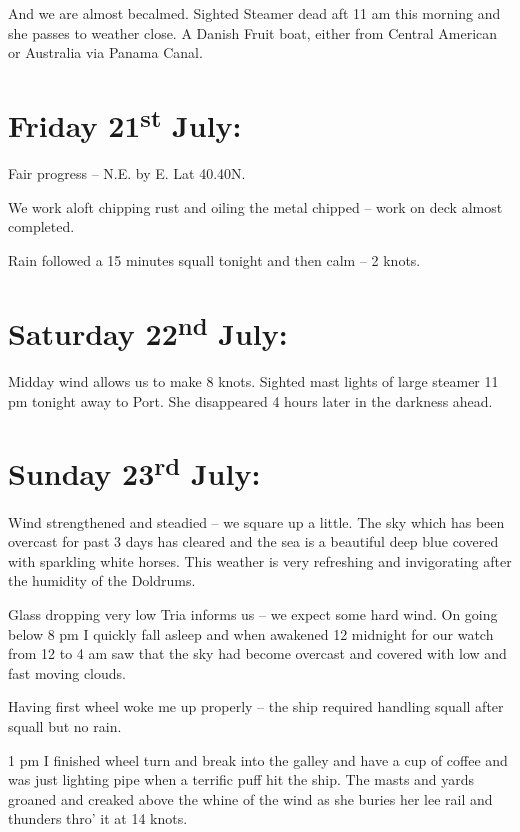 \documentclass[
  11pt,
  msmallroyalvopaper
]{memoir}
\begin{document}
And we are almost becalmed. Sighted Steamer dead aft 11 am this morning
and she passes to weather close. A Danish Fruit boat, either from
Central American or Australia via Panama Canal.

\hypertarget{friday-21st-july}{%
\section{\texorpdfstring{Friday 21\textsuperscript{st}
July:}{Friday 21st July:}}\label{friday-21st-july}}

Fair progress -- N.E. by E. Lat 40.40N.

We work aloft chipping rust and oiling the metal chipped -- work on deck
almost completed.

Rain followed a 15 minutes squall tonight and then calm -- 2 knots.

\hypertarget{saturday-22nd-july}{%
\section{\texorpdfstring{Saturday 22\textsuperscript{nd}
July:}{Saturday 22nd July:}}\label{saturday-22nd-july}}

Midday wind allows us to make 8 knots. Sighted mast lights of large
steamer 11 pm tonight away to Port. She disappeared 4 hours later in the
darkness ahead.

\hypertarget{sunday-23rd-july}{%
\section{\texorpdfstring{Sunday 23\textsuperscript{rd}
July:}{Sunday 23rd July:}}\label{sunday-23rd-july}}

Wind strengthened and steadied -- we square up a little. The sky which
has been overcast for past 3 days has cleared and the sea is a beautiful
deep blue covered with sparkling white horses. This weather is very
refreshing and invigorating after the humidity of the Doldrums.

Glass dropping very low Tria informs us -- we expect some hard wind. On
going below 8 pm I quickly fall asleep and when awakened 12 midnight for
our watch from 12 to 4 am saw that the sky had become overcast and
covered with low and fast moving clouds.

Having first wheel woke me up properly -- the ship required handling
squall after squall but no rain.

1 pm I finished wheel turn and break into the galley and have a cup of
coffee and was just lighting pipe when a terrific puff hit the ship. The
masts and yards groaned and creaked above the whine of the wind as she
buries her lee rail and thunders thro' it at 14 knots.
\end{document}
